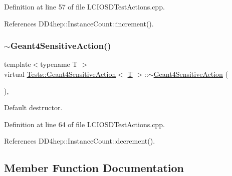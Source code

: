 Definition at line 57 of file L\+C\+I\+O\+S\+D\+Test\+Actions.\+cpp.



References D\+D4hep\+::\+Instance\+Count\+::increment().

\hypertarget{class_tests_1_1_geant4_sensitive_action_a64a85815a59aaada8e3f08a8f02eadf1}{}\label{class_tests_1_1_geant4_sensitive_action_a64a85815a59aaada8e3f08a8f02eadf1} 
\subsubsection{\texorpdfstring{$\sim$\+Geant4\+Sensitive\+Action()}{~Geant4SensitiveAction()}}
{\footnotesize\ttfamily template$<$typename T $>$ \\
virtual \hyperlink{class_tests_1_1_geant4_sensitive_action}{Tests\+::\+Geant4\+Sensitive\+Action}$<$ \hyperlink{class_t}{T} $>$\+::$\sim$\hyperlink{class_tests_1_1_geant4_sensitive_action}{Geant4\+Sensitive\+Action} (\begin{DoxyParamCaption}{ }\end{DoxyParamCaption})\hspace{0.3cm}{\ttfamily [inline]}, {\ttfamily [virtual]}}



Default destructor. 



Definition at line 64 of file L\+C\+I\+O\+S\+D\+Test\+Actions.\+cpp.



References D\+D4hep\+::\+Instance\+Count\+::decrement().



\subsection{Member Function Documentation}
\hypertarget{class_tests_1_1_geant4_sensitive_action_a739fa2551e0217a591c5e99ae09d883a}{}\label{class_tests_1_1_geant4_sensitive_action_a739fa2551e0217a591c5e99ae09d883a} 
